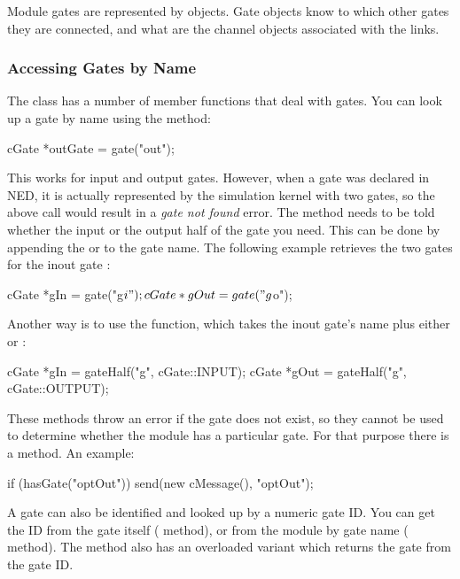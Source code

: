 Module gates are represented by  objects.
Gate objects know to which other gates they are connected, and
what are the channel objects associated with the links.

\subsubsection{Accessing Gates by Name}

The  class has a number of member functions that
deal with gates. You can look up a gate by name using the 
method:

\begin{cpp}
cGate *outGate = gate("out");
\end{cpp}

This works for input and output gates. However, when a gate was declared
 in NED, it is actually represented by the simulation kernel
with two gates, so the above call would result in a \textit{gate not found}
error. The  method needs to be told whether the input or
the output half of the gate you need. This can be done by appending
the  or  to the gate name. The following example
retrieves the two gates for the inout gate :

\begin{cpp}
cGate *gIn = gate("g$i");
cGate *gOut = gate("g$o");
\end{cpp}

Another way is to use the  function, which takes
the inout gate's name plus either  or :

\begin{cpp}
cGate *gIn = gateHalf("g", cGate::INPUT);
cGate *gOut = gateHalf("g", cGate::OUTPUT);
\end{cpp}

These methods throw an error if the gate does not exist, so they cannot
be used to determine whether the module has a particular gate.
For that purpose there is a  method. An example:

\begin{cpp}
if (hasGate("optOut"))
   send(new cMessage(), "optOut");
\end{cpp}

A gate can also be identified and looked up by a numeric gate ID.
You can get the ID from the gate itself ( method),
or from the module by gate name ( method).
The  method also has an overloaded variant which
returns the gate from the gate ID.

